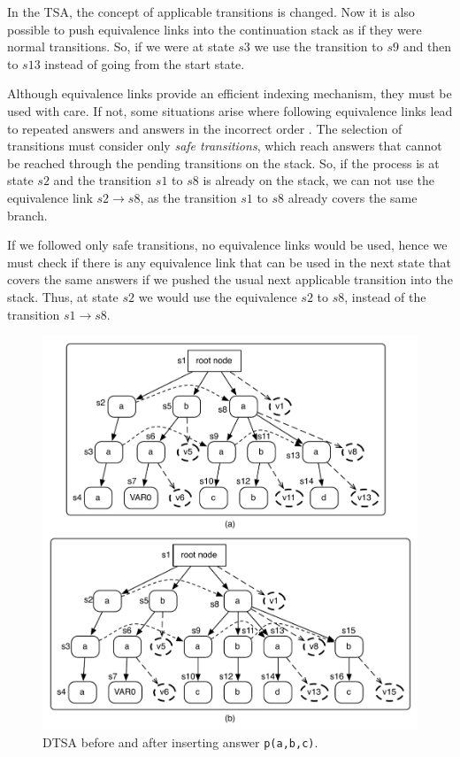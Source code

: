 In the TSA, the concept of applicable transitions is changed. Now it is also possible to push equivalence links
into the continuation stack as if they were normal transitions. So, if we were at state $s3$ we use
the transition to $s9$ and then to $s13$ instead of going from the start state.

Although equivalence links provide an efficient indexing mechanism, they must be used with care. If not,
some situations arise where following equivalence links lead to repeated answers and answers in the incorrect order \cite{Rao-96}.
The selection of transitions must consider only \textit{safe transitions}, which reach answers that cannot be reached through the pending
transitions on the stack.
So, if the process is at state $s2$ and the transition $s1$ to $s8$ is already on the
stack, we can not use the equivalence link $s2 \rightarrow s8$, as the transition $s1$ to $s8$ already covers the same branch.

If we followed only safe transitions, no equivalence links would be used, hence we must check if there is any
equivalence link that can be used in the next state that covers the same answers if we pushed the
usual next applicable transition into the stack. Thus, at state $s2$ we would use the equivalence $s2$ to $s8$, instead of
the transition $s1 \rightarrow s8$.

\begin{figure}[ht]
  \centering
    \includegraphics[scale=0.6]{dtsa.pdf}
  \caption{DTSA before and after inserting answer \texttt{p(a,b,c)}.}
  \label{fig:dtsa_example}
\end{figure}
 
